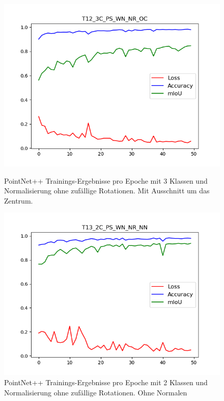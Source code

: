 \documentclass[12pt,titlepage, twoside]{article}
\begin{document}
\begin{figure}
    \centering
    \begin{minipage}{0.475\textwidth}
        \centering
        \includegraphics[width=1.0\textwidth]{./Images/T12_3C_PS_WN_NR_OC.png}
        \caption{PointNet++ Trainings-Ergebnisse pro Epoche mit 3 Klassen und Normalisierung ohne zufällige Rotationen. Mit Ausschnitt um das Zentrum.}
        \label{fig:T12_3C_PS_WN_NR_OC}
    \end{minipage}\hfill
    \begin{minipage}{0.475\textwidth}
        \centering
        \includegraphics[width=1.0\textwidth]{./Images/T13_2C_PS_WN_NR_NN.png}
        \caption{PointNet++ Trainings-Ergebnisse pro Epoche mit 2 Klassen und Normalisierung ohne zufällige Rotationen. Ohne Normalen}
        \label{fig:T13_2C_PS_WN_NR_NN}
    \end{minipage}
\end{figure}
\end{document}
